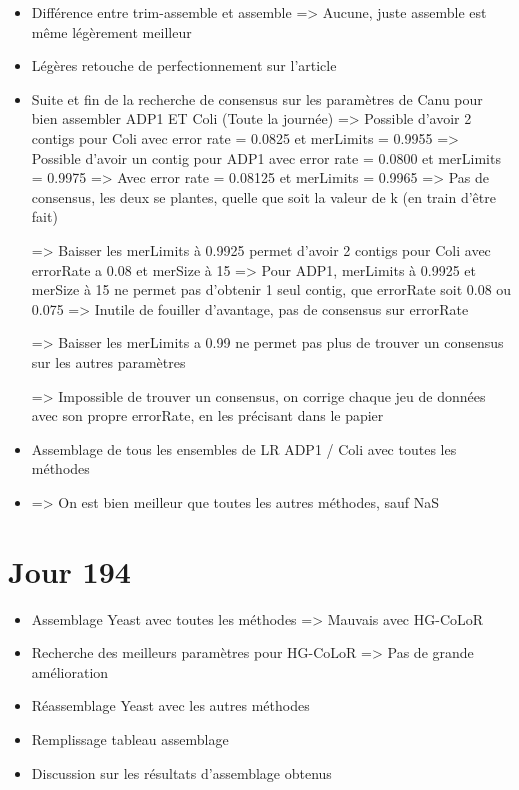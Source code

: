 \documentclass[12pt]{report}
\begin{document}
\begin{itemize}
	\item Différence entre trim-assemble et assemble => Aucune, juste assemble est même légèrement meilleur
	
	\item Légères retouche de perfectionnement sur l'article
	
	\item Suite et fin de la recherche de consensus sur les paramètres de Canu pour bien assembler ADP1 ET Coli (Toute la journée)
		  => Possible d'avoir 2 contigs pour Coli avec error rate = 0.0825 et merLimits = 0.9955
		  => Possible d'avoir un contig pour ADP1 avec error rate = 0.0800 et merLimits = 0.9975
		  => Avec error rate = 0.08125 et merLimits = 0.9965 => Pas de consensus, les deux se plantes, quelle que soit la valeur de k (en train d'être fait)
		  
		  => Baisser les merLimits à 0.9925 permet d'avoir 2 contigs pour Coli avec errorRate a 0.08 et merSize à 15
		  => Pour ADP1, merLimits à 0.9925 et merSize à 15 ne permet pas d'obtenir 1 seul contig, que errorRate soit 0.08 ou 0.075
		  => Inutile de fouiller d'avantage, pas de consensus sur errorRate
		  
		  => Baisser les merLimits a 0.99 ne permet pas plus de trouver un consensus sur les autres paramètres
		 
		  => Impossible de trouver un consensus, on corrige chaque jeu de données avec son propre errorRate, en les précisant dans le papier
		  
	\item Assemblage de tous les ensembles de LR ADP1 / Coli avec toutes les méthodes
	
	\item => On est bien meilleur que toutes les autres méthodes, sauf NaS
\end{itemize}

\section{Jour 194}

\begin{itemize}
	\item Assemblage Yeast avec toutes les méthodes => Mauvais avec HG-CoLoR
	
	\item Recherche des meilleurs paramètres pour HG-CoLoR => Pas de grande amélioration
	
	\item Réassemblage Yeast avec les autres méthodes
	
	\item Remplissage tableau assemblage
	
	\item Discussion sur les résultats d'assemblage obtenus
\end{itemize}
\end{document}
